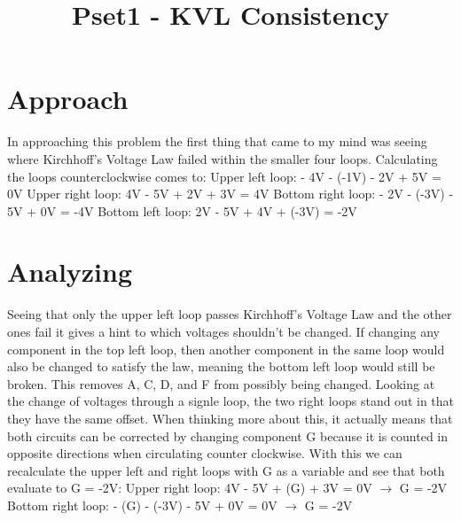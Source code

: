 \documentclass{article}
\begin{document}
{\tiny
\title{Pset1 - KVL Consistency}
\date{}

\maketitle
}

\section{Approach}
In approaching this problem the first thing that came to
my mind was seeing where Kirchhoff's Voltage Law failed
within the smaller four loops.
\newline
\newline
Calculating the loops counterclockwise comes to:
\newline
Upper left loop: - 4V - (-1V) - 2V + 5V = 0V
\newline
Upper right loop: 4V - 5V + 2V + 3V = 4V
\newline
Bottom right loop: - 2V - (-3V) - 5V + 0V = -4V
\newline
Bottom left loop: 2V - 5V + 4V + (-3V) = -2V

\section{Analyzing}
Seeing that only the upper left loop passes
Kirchhoff's Voltage Law and the other ones fail
it gives a hint to which voltages shouldn't be changed.
If changing any component in the top left loop, then
another component in the same loop would also be changed to
satisfy the law, meaning the bottom left loop would still be
broken. This removes A, C, D, and F from possibly being changed.
\newline
\newline
Looking at the change of voltages through a signle loop,
the two right loops stand out in that they have the same offset.
When thinking more about this, it actually means that both circuits
can be corrected by changing component G because it is counted in
opposite directions when circulating counter clockwise.
\newline
\newline
With this we can recalculate the upper left and right
loops with G as a variable and see that both evaluate to G = -2V:
\newline
Upper right loop: 4V - 5V + (G) + 3V = 0V $\rightarrow$ G = -2V
\newline
Bottom right loop: - (G) - (-3V) - 5V + 0V = 0V $\rightarrow$ G = -2V
\end{document}

